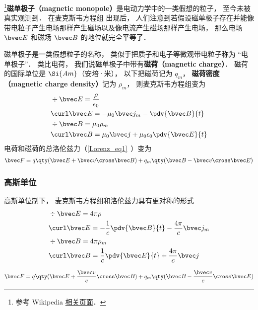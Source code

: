 
\begin{issues}
\issueDraft
\end{issues}



\footnote{参考 Wikipedia \href{https://en.wikipedia.org/wiki/Magnetic_monopole}{相关页面}．}\textbf{磁单极子（magnetic monopole）}是电动力学中的一类假想的粒子， 至今未被真实观测到． 在麦克斯韦方程组 出现后， 人们注意到若假设磁单极子存在并能像带电粒子产生电场那样产生磁场以及像电流产生磁场那样产生电场， 那么电场 $\bvec E$ 和磁场 $\bvec B$ 的地位就完全平等了．

磁单极子是一类假想粒子的名称， 类似于把质子和电子等微观带电粒子称为 “电单极子”． 类比电荷， 我们说磁单极子中带有\textbf{磁荷（magnetic charge）}． 磁荷的国际单位是 $\Si{Am}$（安培·米）， 以下把磁荷记为 $q_m$， \textbf{磁荷密度（magnetic charge density）}记为 $\rho_m$， 则麦克斯韦方程组变为
\begin{equation}
\begin{aligned}
&\div \bvec E = \frac{\rho}{\epsilon_0}\\
&\curl \bvec E = - \mu_0 \bvec j_m -\pdv{\bvec B}{t}\\
&\div \bvec B = \mu_0 \rho_m \\
&\curl \bvec B = \mu_0 \bvec j + \mu_0\epsilon_0 \pdv{\bvec E}{t}
\end{aligned}
\end{equation}
电荷和磁荷的总洛伦兹力（\autoref{Lorenz_eq1}~）变为
\begin{align}
\bvec F = q \qty(\bvec E + \bvec v \cross \bvec B) +
q_m \qty(\bvec B - \bvec v \cross \bvec E)
\end{align}

\subsubsection{高斯单位}
高斯单位制下， 麦克斯韦方程组和洛伦兹力具有更对称的形式
\begin{equation}\label{BMono_eq1}
\begin{aligned}
&\div \bvec E = 4\pi\rho\\
&\curl \bvec E = -\frac{1}{c}\pdv{\bvec B}{t}  - \frac{4\pi}{c}\bvec j_m\\
&\div \bvec B = 4\pi\rho_m \\
&\curl \bvec B = \frac{1}{c}\pdv{\bvec E}{t} + \frac{4\pi}{c} \bvec j
\end{aligned}
\end{equation}

\begin{equation}
\bvec F = q \qty(\bvec E + \frac{\bvec v}{c}\cross \bvec B) + q_m \qty(\bvec B - \frac{\bvec v}{c}\cross \bvec E)
\end{equation}
